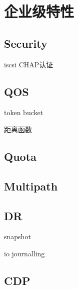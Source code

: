\chapter{企业级特性}

\section{Security}

iscsi CHAP认证

\section{QOS}

token bucket

距离函数

\section{Quota}

\section{Multipath}

\section{DR}

snapshot

io journalling

\section{CDP}
